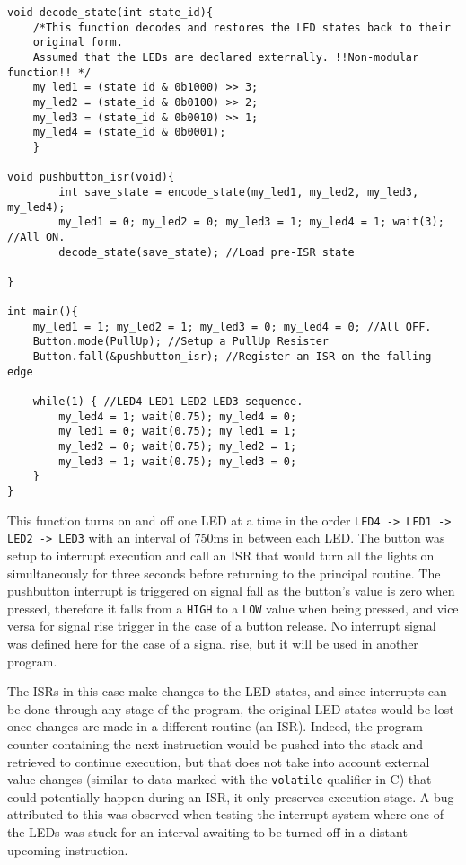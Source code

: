 \documentclass{article}
\begin{document}
\begin{verbatim}
void decode_state(int state_id){
    /*This function decodes and restores the LED states back to their
    original form.
    Assumed that the LEDs are declared externally. !!Non-modular function!! */
    my_led1 = (state_id & 0b1000) >> 3;
    my_led2 = (state_id & 0b0100) >> 2;
    my_led3 = (state_id & 0b0010) >> 1;
    my_led4 = (state_id & 0b0001);
    }

void pushbutton_isr(void){
        int save_state = encode_state(my_led1, my_led2, my_led3, my_led4);
        my_led1 = 0; my_led2 = 0; my_led3 = 1; my_led4 = 1; wait(3); //All ON.
        decode_state(save_state); //Load pre-ISR state
        
}

int main(){
    my_led1 = 1; my_led2 = 1; my_led3 = 0; my_led4 = 0; //All OFF.
    Button.mode(PullUp); //Setup a PullUp Resister
    Button.fall(&pushbutton_isr); //Register an ISR on the falling edge
    
    while(1) { //LED4-LED1-LED2-LED3 sequence.
        my_led4 = 1; wait(0.75); my_led4 = 0;
        my_led1 = 0; wait(0.75); my_led1 = 1;
        my_led2 = 0; wait(0.75); my_led2 = 1;
        my_led3 = 1; wait(0.75); my_led3 = 0;     
    }
}
\end{verbatim}
\pagebreak

This function turns on and off one LED at a time in the order \texttt{LED4 -> LED1 -> LED2 -> LED3} with an interval of 750ms in between each LED. The button was setup to interrupt execution and call an ISR that would turn all the lights on simultaneously for three seconds before returning to the principal routine. The pushbutton interrupt is triggered on signal fall as the button's value is zero when pressed, therefore it falls from a \texttt{HIGH} to a \texttt{LOW} value when being pressed, and vice versa for signal rise trigger in the case of a button release. No interrupt signal was defined here for the case of a signal rise, but it will be used in another program.

The ISRs in this case make changes to the LED states, and since interrupts can be done through any stage of the program, the original LED states would be lost once changes are made in a different routine (an ISR). Indeed, the program counter containing the next instruction would be pushed into the stack and retrieved to continue execution, but that does not take into account external value changes (similar to data marked with the \texttt{volatile} qualifier in C) that could potentially happen during an ISR, it only preserves execution stage. A bug attributed to this was observed when testing the interrupt system where one of the LEDs was stuck for an interval awaiting to be turned off in a distant upcoming instruction.
\end{document}
